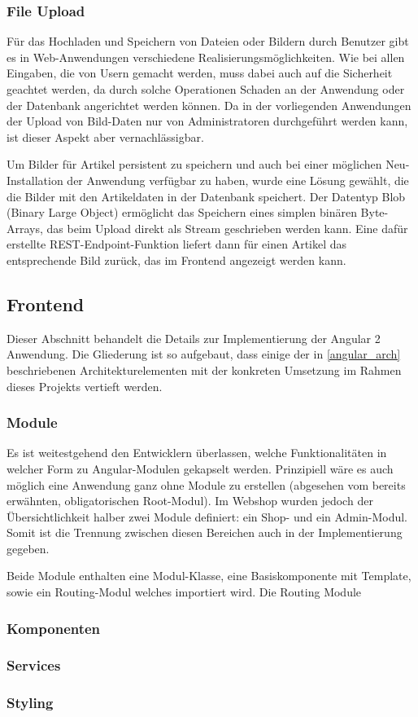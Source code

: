 \subsubsection{File Upload}
Für das Hochladen und Speichern von Dateien oder Bildern durch Benutzer gibt es in Web-Anwendungen verschiedene Realisierungsmöglichkeiten.
Wie bei allen Eingaben, die von Usern gemacht werden, muss dabei auch auf die Sicherheit geachtet werden, da durch solche Operationen Schaden an der Anwendung oder der Datenbank angerichtet werden können.
Da in der vorliegenden Anwendungen der Upload von Bild-Daten nur von Administratoren durchgeführt werden kann, ist dieser Aspekt aber vernachlässigbar.

Um Bilder für Artikel persistent zu speichern und auch bei einer möglichen Neu-Installation der Anwendung verfügbar zu haben, wurde eine Lösung gewählt, die die Bilder mit den Artikeldaten in der Datenbank speichert.
Der Datentyp \acs{Blob} (Binary Large Object) ermöglicht das Speichern eines simplen binären Byte-Arrays, das beim Upload direkt als Stream geschrieben werden kann.
Eine dafür erstellte REST-Endpoint-Funktion liefert dann für einen Artikel das entsprechende Bild zurück, das im Frontend angezeigt werden kann.
\subsection{Frontend}
Dieser Abschnitt behandelt die Details zur Implementierung der Angular 2 Anwendung. Die Gliederung ist so aufgebaut, dass einige der in \cref{angular_arch} beschriebenen   Architekturelementen mit der konkreten Umsetzung im Rahmen dieses Projekts vertieft werden.

\subsubsection{Module}
Es ist weitestgehend den Entwicklern überlassen, welche Funktionalitäten in welcher Form zu Angular-Modulen gekapselt werden. Prinzipiell wäre es auch möglich eine Anwendung ganz ohne Module zu erstellen (abgesehen vom bereits erwähnten, obligatorischen Root-Modul). Im Webshop wurden jedoch der Übersichtlichkeit halber zwei Module definiert: ein Shop- und ein Admin-Modul. Somit ist die Trennung zwischen diesen Bereichen auch in der Implementierung gegeben.

Beide Module enthalten eine Modul-Klasse, eine Basiskomponente mit Template, sowie ein Routing-Modul welches importiert wird. Die Routing Module


\subsubsection{Komponenten}

\subsubsection{Services}

\subsubsection{Styling}
